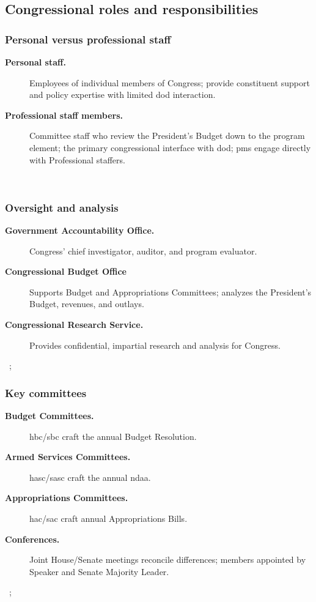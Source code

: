 \documentclass[../main.tex]{subfiles}
\begin{document}
\subsection{Congressional roles and responsibilities}
\subsubsection{Personal versus professional staff}
\begin{description}
  \item[\textbf{Personal staff.}] Employees of individual members of Congress; provide constituent support and policy expertise with limited \ac{dod} interaction.
  \item[\textbf{Professional staff members.}] Committee staff who review the President's Budget down to the program element; the primary congressional interface with \ac{dod}; \acp{pm} engage directly with Professional staffers.
\end{description}
~

\subsubsection{Oversight and analysis}
\begin{description}
  \item[\textbf{Government Accountability Office.}] Congress' chief investigator, auditor, and program evaluator.
  \item[\textbf{Congressional Budget Office}] Supports Budget and Appropriations Committees; analyzes the President's Budget, revenues, and outlays.
  \item[\textbf{Congressional Research Service.}] Provides confidential, impartial research and analysis for Congress.
\end{description}
~\autocite{GAO-About-2026,CBO-Introduction-2026,CRS-About-2026}; 

\subsubsection{Key committees}
\begin{description}
  \item[\textbf{Budget Committees.}] \ac{hbc}/\ac{sbc} craft the annual Budget Resolution.
  \item[\textbf{Armed Services Committees.}] \ac{hasc}/\ac{sasc} craft the annual \ac{ndaa}.
  \item[\textbf{Appropriations Committees.}] \ac{hac}/\ac{sac} craft annual Appropriations Bills.
  \item[\textbf{Conferences.}] Joint House/Senate meetings reconcile differences; members appointed by Speaker and Senate Majority Leader.
\end{description}
~\autocite{CRS-R47235-Budget-Process-Timeline,CRS-R46497-Authorizations-Appropriations,HASC-Subcommittees-2026,SASC-Subcommittee-Leadership-119-2025,HAC-Subcommittees-2026,SAC-Subcommittees-2026}; 
\end{document}
